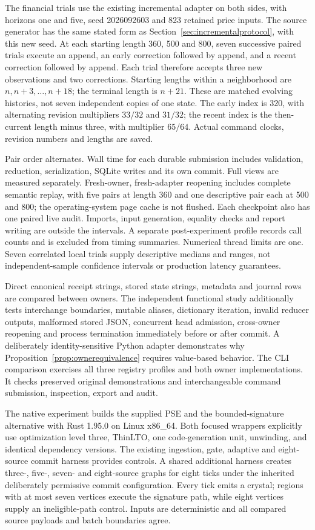\documentclass[11pt,a4paper]{article}
\theoremstyle{definition}\newtheorem{definition}[theorem]{Definition}
\begin{document}
The financial trials use the existing incremental adapter on both sides, with horizons one and five, seed 2026092603 and 823 retained price inputs. The source generator has the same stated form as Section~\ref{sec:incrementalprotocol}, with this new seed. At each starting length 360, 500 and 800, seven successive paired trials execute an append, an early correction followed by append, and a recent correction followed by append. Each trial therefore accepts three new observations and two corrections. Starting lengths within a neighborhood are $n,n+3,\ldots,n+18$; the terminal length is $n+21$. These are matched evolving histories, not seven independent copies of one state. The early index is 320, with alternating revision multipliers $33/32$ and $31/32$; the recent index is the then-current length minus three, with multiplier $65/64$. Actual command clocks, revision numbers and lengths are saved.

Pair order alternates. Wall time for each durable submission includes validation, reduction, serialization, SQLite writes and its own commit. Full views are measured separately. Fresh-owner, fresh-adapter reopening includes complete semantic replay, with five pairs at length 360 and one descriptive pair each at 500 and 800; the operating-system page cache is not flushed. Each checkpoint also has one paired live audit. Imports, input generation, equality checks and report writing are outside the intervals. A separate post-experiment profile records call counts and is excluded from timing summaries. Numerical thread limits are one. Seven correlated local trials supply descriptive medians and ranges, not independent-sample confidence intervals or production latency guarantees.

Direct canonical receipt strings, stored state strings, metadata and journal rows are compared between owners. The independent functional study additionally tests interchange boundaries, mutable aliases, dictionary iteration, invalid reducer outputs, malformed stored JSON, concurrent head admission, cross-owner reopening and process termination immediately before or after commit. A deliberately identity-sensitive Python adapter demonstrates why Proposition~\ref{prop:ownerequivalence} requires value-based behavior. The CLI comparison exercises all three registry profiles and both owner implementations. It checks preserved original demonstrations and interchangeable command submission, inspection, export and audit.

The native experiment builds the supplied PSE and the bounded-signature alternative with Rust 1.95.0 on Linux x86\_64. Both focused wrappers explicitly use optimization level three, ThinLTO, one code-generation unit, unwinding, and identical dependency versions. The existing ingestion, gate, adaptive and eight-source commit harness provides controls. A shared additional harness creates three-, five-, seven- and eight-source graphs for eight ticks under the inherited deliberately permissive commit configuration. Every tick emits a crystal; regions with at most seven vertices execute the signature path, while eight vertices supply an ineligible-path control. Inputs are deterministic and all compared source payloads and batch boundaries agree.
\end{document}
